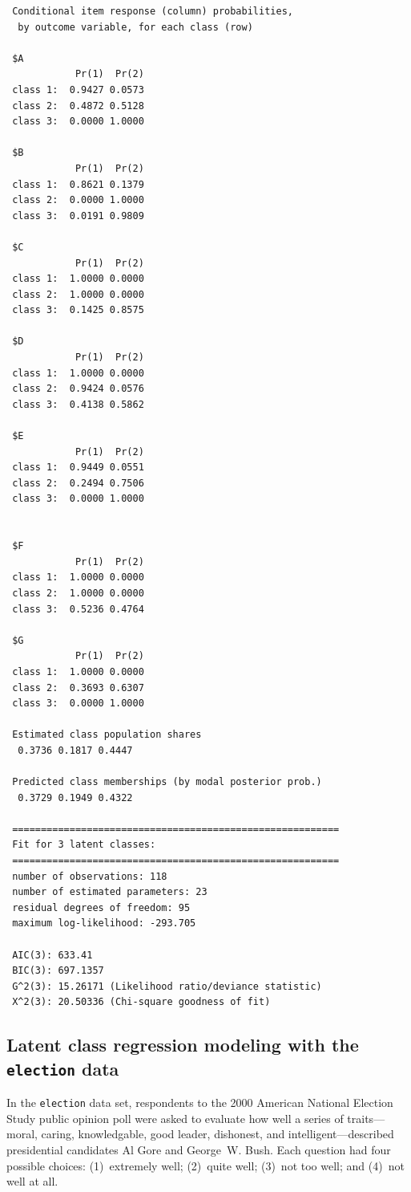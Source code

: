 \documentclass[letterpaper,12pt]{article}
\begin{document}
\begin{verbatim}
 Conditional item response (column) probabilities,
  by outcome variable, for each class (row)

 $A
            Pr(1)  Pr(2)
 class 1:  0.9427 0.0573
 class 2:  0.4872 0.5128
 class 3:  0.0000 1.0000

 $B
            Pr(1)  Pr(2)
 class 1:  0.8621 0.1379
 class 2:  0.0000 1.0000
 class 3:  0.0191 0.9809

 $C
            Pr(1)  Pr(2)
 class 1:  1.0000 0.0000
 class 2:  1.0000 0.0000
 class 3:  0.1425 0.8575

 $D
            Pr(1)  Pr(2)
 class 1:  1.0000 0.0000
 class 2:  0.9424 0.0576
 class 3:  0.4138 0.5862

 $E
            Pr(1)  Pr(2)
 class 1:  0.9449 0.0551
 class 2:  0.2494 0.7506
 class 3:  0.0000 1.0000


 $F
            Pr(1)  Pr(2)
 class 1:  1.0000 0.0000
 class 2:  1.0000 0.0000
 class 3:  0.5236 0.4764

 $G
            Pr(1)  Pr(2)
 class 1:  1.0000 0.0000
 class 2:  0.3693 0.6307
 class 3:  0.0000 1.0000

 Estimated class population shares
  0.3736 0.1817 0.4447

 Predicted class memberships (by modal posterior prob.)
  0.3729 0.1949 0.4322

 =========================================================
 Fit for 3 latent classes:
 =========================================================
 number of observations: 118
 number of estimated parameters: 23
 residual degrees of freedom: 95
 maximum log-likelihood: -293.705

 AIC(3): 633.41
 BIC(3): 697.1357
 G^2(3): 15.26171 (Likelihood ratio/deviance statistic)
 X^2(3): 20.50336 (Chi-square goodness of fit)
\end{verbatim}


\subsection[Latent class regression modeling]{Latent class regression modeling with the \texttt{election} data}

In the \texttt{election} data set, respondents to the 2000 American National Election Study public opinion poll were asked to evaluate how well a series of traits---moral, caring, knowledgable, good leader, dishonest, and intelligent---described presidential candidates Al Gore and George~W. Bush.  Each question had four possible choices: (1)~extremely well; (2)~quite well; (3)~not too well; and (4)~not well at all.
\end{document}
